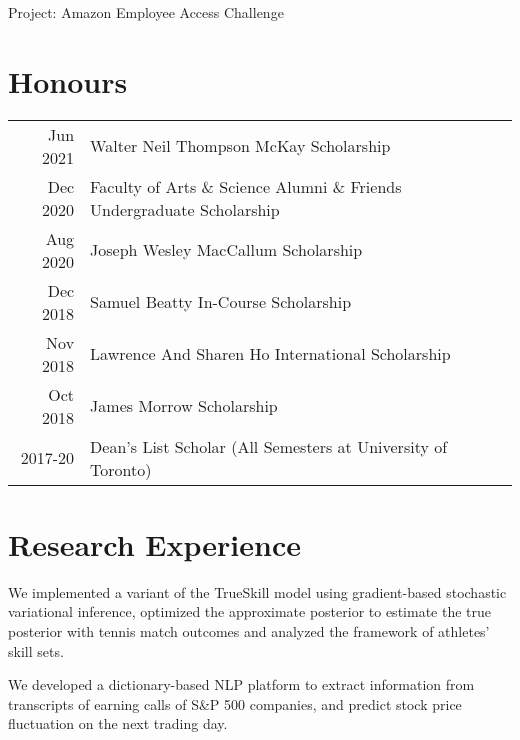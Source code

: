 \documentclass[letterpaper]{deedy-resume} %
\begin{document}
\begin{minipage}[t]{0.66\textwidth}
\begin{tightitemize}
\item Project: Amazon Employee Access Challenge
\end{tightitemize}


\section{Honours} 

\begin{tabular}{rll}
Jun 2021	 & Walter Neil Thompson McKay Scholarship \\
Dec 2020	 & Faculty of Arts \& Science Alumni \& Friends Undergraduate Scholarship \\
Aug 2020	 & Joseph Wesley MacCallum Scholarship \\
Dec 2018	 & Samuel Beatty In-Course Scholarship \\
Nov 2018	 & Lawrence And Sharen Ho International Scholarship\\
Oct 2018	 & James Morrow Scholarship \\
2017-20		 & Dean's List Scholar (All Semesters at University of Toronto)
\end{tabular}

\sectionspace %



\section{Research Experience}
\small{We implemented a variant of the TrueSkill model using gradient-based stochastic variational inference, optimized the approximate posterior to estimate the true posterior with tennis match outcomes and analyzed the framework of athletes' skill sets.}

\sectionspace

\small {We developed a dictionary-based NLP platform to extract information from transcripts of earning calls of S\&P 500 companies, and predict stock price fluctuation on the next trading day.}


\end{minipage}
\end{document}
